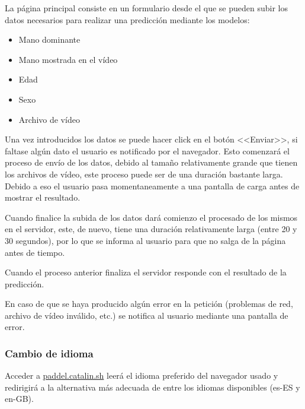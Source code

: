 La página principal consiste en un formulario desde el que se pueden subir los
datos necesarios para realizar una predicción mediante los modelos:

\begin{itemize}
    \item Mano dominante
    \item Mano mostrada en el vídeo
    \item Edad
    \item Sexo
    \item Archivo de vídeo
\end{itemize}


Una vez introducidos los datos se puede hacer click en el botón <<Enviar>>, si
faltase algún dato el usuario es notificado por el navegador. Esto comenzará el
proceso de envío de los datos, debido al tamaño relativamente grande que tienen
los archivos de vídeo, este proceso puede ser de una duración bastante larga.
Debido a eso el usuario pasa momentaneamente a una pantalla de carga antes de
mostrar el resultado.


Cuando finalice la subida de los datos dará comienzo el procesado de los mismos
en el servidor, este, de nuevo, tiene una duración relativamente larga (entre 20
y 30 segundos), por lo que se informa al usuario para que no salga de la página
antes de tiempo.


Cuando el proceso anterior finaliza el servidor responde con el resultado de la
predicción.


En caso de que se haya producido algún error en la petición (problemas de red,
archivo de vídeo inválido, etc.) se notifica al usuario mediante una pantalla de
error.


\subsubsection{Cambio de idioma}

Acceder a \href{https://paddle.catalin.sh}{paddel.catalin.sh} leerá el idioma
preferido del navegador usado y redirigirá a la alternativa más adecuada de
entre los idiomas disponibles (es-ES y en-GB).

